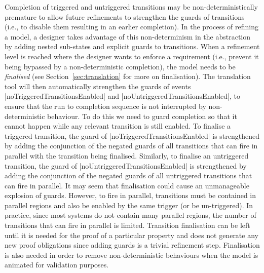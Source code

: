 Completion of triggered and untriggered transitions may be non-deterministically premature to allow future refinements to strengthen the guards of transitions (i.e., to disable them resulting in an earlier completion).
In the process of refining a model, a designer takes advantage of this non-determinism in the abstraction by adding nested sub-states and explicit guards to transitions. 
When a refinement level is reached where the designer wants to enforce a requirement (i.e., prevent it being bypassed by a non-deterministic completion), the model needs to be \emph{finalised} (see Section~\ref{sec:translation} for more on finalisation). 
The \SCXML translation tool will then automatically strengthen the guards of events |noTriggeredTransitionsEnabled| and |noUntriggeredTransitionsEnabled|, to ensure that the run to completion sequence is not interrupted by non-deterministic behaviour. 
To do this we need to guard completion so that it cannot happen while any relevant transition is still enabled.
To finalise a triggered transition, the guard of |noTriggeredTransitionsEnabled| is strengthened by adding the conjunction of the negated guards of all transitions that can fire in parallel with the transition being finalised.
Similarly, to finalise an untriggered transition, the guard of |noUntriggeredTransitionsEnabled| is strengthened by adding the conjunction of the negated guards of all untriggered transitions that can fire in parallel.
It may seem that finalisation could cause an unmanageable explosion of guards.
However, to fire in parallel, transitions must be contained in parallel regions and also be enabled by the same trigger (or be un-triggered).
In practice, since most systems do not contain many parallel regions, the number of transitions that can fire in parallel is limited.
Transition finalisation can be left until it is needed for the proof of a particular property and does not generate any new proof obligations since adding guards is a trivial refinement step.
Finalisation is also needed in order to remove non-deterministic behaviours when the model is animated for validation purposes.



